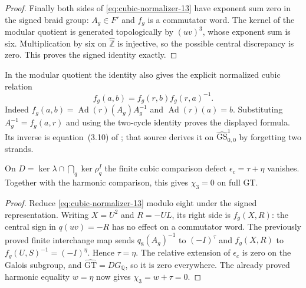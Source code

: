 \begin{proof}
Finally both sides of \eqref{eq:cubic-normalizer-13} have exponent sum zero in the
signed braid group: $A_g\in F'$ and $f_g$ is a commutator
word. The kernel of the modular quotient is generated
topologically by $(uv)^3$, whose exponent sum is six.
Multiplication by six on $\widehat{\mathbb Z}$ is injective,
so the possible central discrepancy is zero. This proves
the signed identity exactly.
\end{proof}

In the modular quotient the identity also gives the explicit
normalized cubic relation
\[
 f_g(a,b)=f_g(r,b)f_g(r,a)^{-1}.
\]
Indeed $f_g(a,b)=\operatorname{Ad}(r)(A_g)A_g^{-1}$ and
$\operatorname{Ad}(r)(a)=b$. Substituting
$A_g^{-1}=f_g(a,r)$ and using the two-cycle identity proves
the displayed formula. Its inverse is equation~(3.10) of
\cite[p.~667]{Schneps2006Special}; that source derives it on
$\widehat{\mathrm{GS}}^1_{0,0}$ by forgetting two strands.


\begin{corollary}\label{cor:cubic-defect-zero-normalizer}
On $D=\ker\lambda\cap\bigcap_q\ker\rho_q^I$ the finite
cubic comparison defect $\epsilon_c=\tau+\eta$ vanishes.
Together with the harmonic comparison, this gives
$\chi_3=0$ on full GT.
\end{corollary}
\begin{proof}
Reduce \eqref{eq:cubic-normalizer-13} modulo eight under the signed representation.
Writing $X=U^2$ and $R=-UL$, its right side is $f_g(X,R)$:
the central sign in $q(uv)=-R$ has no effect on a commutator
word. The previously proved finite interchange map sends
$q_8(A_g)^{-1}$ to $(-I)^\tau$ and $f_g(X,R)$ to
$f_g(U,S)^{-1}=(-I)^\eta$. Hence $\tau=\eta$.
The relative extension of $\epsilon_c$ is zero on the Galois
subgroup, and $\widehat{\mathrm{GT}}=D G_{\mathbb Q}$,
so it is zero everywhere. The already proved harmonic
equality $w=\eta$ now gives $\chi_3=w+\tau=0$.
\end{proof}

